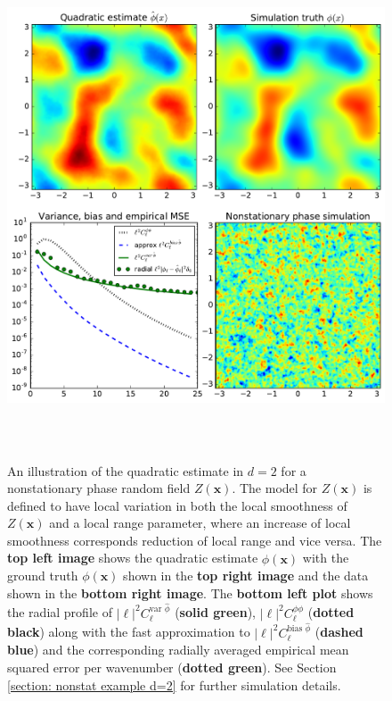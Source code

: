 \documentclass[10pt,noinfoline]{imsart}
\newcommand{\bs}{\boldsymbol}
\begin{document}
\begin{figure}
\includegraphics[height=15cm]{figure4.pdf}%
\caption{An illustration of the quadratic estimate in $d=2$ for a nonstationary phase random field $Z(\bs x)$. The model for $Z(\bs x)$ is defined to have local variation in both the local smoothness of $Z(\bs x)$ and a local range parameter, where an increase of local smoothness corresponds reduction of local range and vice versa. The \textbf{top left image} shows the quadratic estimate $\hat\phi(\bs x)$ with the  ground truth $\phi(\bs x)$ shown in the \textbf{top right image} and the data shown in the \textbf{bottom right image}.  The \textbf{bottom left plot} shows the radial profile of  $|\bs \ell|^2C_{\bs \ell}^{\text{var }\hat\phi}$ (\textbf{solid green}), $|\bs \ell|^2C_{\bs \ell}^{\phi\phi}$ (\textbf{dotted black}) along with the fast approximation to $|\bs \ell|^2C_{\bs \ell}^{\text{bias }\hat\phi}$ (\textbf{dashed blue}) and the corresponding radially averaged empirical mean squared error per wavenumber (\textbf{dotted green}). See Section \ref{section: nonstat example d=2} for further simulation details.
 }
\label{Figure 3}
\end{figure}
\end{document}
